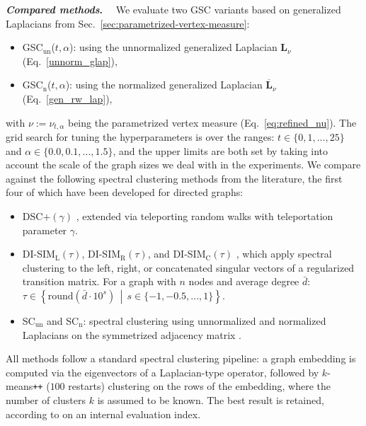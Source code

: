 \documentclass[10pt]{article} %
\def\rmL{{\mathbf{L}}}
\newcommand{\GSC}{GSC\xspace}
\newcommand{\GSCn}{GSC$_{\text{n}}$\xspace}
\newcommand{\GSCun}{GSC$_{\text{un}}$\xspace}
\renewcommand{\dots}{...}
\newcommand{\inlinetitle}[2]{\noindent\textbf{\textit{#1}{#2}}~~}
\begin{document}
\inlinetitle{Compared methods}{.}%
We evaluate two \GSC variants based on generalized Laplacians from Sec.~\ref{sec:parametrized-vertex-measure}:
\begin{itemize}[leftmargin=1.4em, topsep=-0.2em, itemsep=-0.5em]
  \item \GSCun($t,\alpha$): using the unnormalized generalized Laplacian $\rmL_\nu$ (Eq.~\ref{unnorm_glap}),
  \item \GSCn($t,\alpha$): using the normalized generalized Laplacian $\overline{\rmL}_\nu$ (Eq.~\ref{gen_rw_lap}),
\end{itemize}
with $\nu := \nu_{t, \alpha}$ being the parametrized vertex measure (Eq.~\ref{eq:refined_nu}). The grid search for tuning the hyperparameters is over the ranges:
$t \in \{0, 1, \dots, 25\}$ and $\alpha \in \{0.0, 0.1, \dots, 1.5\}$, and the upper limits are both set by taking into account the scale of the graph sizes we deal with in the experiments.
%
We compare against the following spectral clustering methods from the literature, the first four of which have been developed for directed graphs:
\begin{itemize}[leftmargin=1.4em, topsep=-0.2em, itemsep=-0.5em]
  \item DSC$+ (\gamma)$ \citep{zhou2005learning, palmer2020spectral}, extended via teleporting random walks \citep{page1999pagerank} with teleportation parameter $\gamma$.
  \item DI-SIM$_\text{L}(\tau)$, DI-SIM$_\text{R}(\tau)$, and DI-SIM$_\text{C}(\tau)$ \citep{rohe2016co}, which apply spectral clustering to the left, right, or concatenated singular vectors of a regularized transition matrix. For a graph with $n$ nodes and average degree $\bar{d}$:  $\tau \in \left\{ \text{round}\left( \bar{d} \cdot 10^{s} \right) \,\middle|\, s \in \{-1, -0.5, \dots, 1\} \right\}$.
  \item SC$_{\text{un}}$ and SC$_{\text{n}}$: spectral clustering using unnormalized and normalized Laplacians on the symmetrized adjacency matrix \citep{von2007tutorial}.
\end{itemize}

All methods follow a standard spectral clustering pipeline: a graph embedding is computed via the eigenvectors of a Laplacian-type operator, followed by $k$-means\texttt{++} ($100$ restarts) clustering \citep{kmeans++2007} on the rows of the embedding, where the number of clusters $k$ is assumed to be known. The best result is retained, according to on an internal evaluation index.
\end{document}
